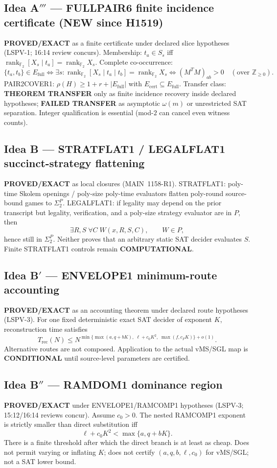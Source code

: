 \documentclass[11pt]{article}
\begin{document}
\subsection*{Idea A$'''$ --- FULLPAIR6 finite incidence certificate (NEW since H1519)}
\textbf{PROVED/EXACT} as a finite certificate under declared slice hypotheses
(LSPV-1; 16:14 review concurs). Membership:
$t_a\in S_s$ iff $\operatorname{rank}_{\mathbb F_2}[X_s\mid t_a]
=\operatorname{rank}_{\mathbb F_2}X_s$. Complete co-occurrence:
\[
\{t_a,t_b\}\in E_{\mathrm{full}}
\iff
\exists s:\operatorname{rank}_{\mathbb F_2}[X_s\mid t_a\mid t_b]
=\operatorname{rank}_{\mathbb F_2}X_s
\iff
(M^TM)_{ab}>0\quad(\text{over }\mathbb Z_{\ge 0}).
\]
PAIR2COVER1: $\rho(H)\ge 1+r+|E_{\mathrm{full}}|$ with
$E_{\mathrm{cert}}\subseteq E_{\mathrm{full}}$. Transfer class:
\textbf{THEOREM TRANSFER} only as finite incidence recovery inside declared
hypotheses; \textbf{FAILED TRANSFER} as asymptotic $\omega(m)$ or unrestricted SAT
separation. Integer qualification is essential (mod-$2$ can cancel even witness
counts).

\subsection*{Idea B --- STRATFLAT1 / LEGALFLAT1 succinct-strategy flattening}
\textbf{PROVED/EXACT} as local closures (MAIN~1158-R1).
STRATFLAT1: poly-time Skolem openings / poly-size poly-time evaluators flatten
poly-round source-bound games to $\Sigma_2^P$.
LEGALFLAT1: if legality may depend on the prior transcript but legality,
verification, and a poly-size strategy evaluator are in $P$, then
\[
\exists R,S\;\forall C\;W(x,R,S,C),\qquad W\in P,
\]
hence still in $\Sigma_2^P$. Neither proves that an arbitrary static SAT decider
evaluates $S$. Finite STRATFLAT1 controls remain \textbf{COMPUTATIONAL}.

\subsection*{Idea B$'$ --- ENVELOPE1 minimum-route accounting}
\textbf{PROVED/EXACT} as an accounting theorem under declared route hypotheses
(LSPV-3). For one fixed deterministic exact SAT decider of exponent $K$,
reconstruction time satisfies
\[
T_{\mathrm{rec}}(N)\le N^{\min\{\max(a,q+bK),\;\ell+c_0K^2,\;\max(f,c_FK)\}+o(1)}.
\]
Alternative routes are not composed. Application to the actual vMS/SGL map is
\textbf{CONDITIONAL} until source-level parameters are certified.

\subsection*{Idea B$''$ --- RAMDOM1 dominance region}
\textbf{PROVED/EXACT} under ENVELOPE1/RAMCOMP1 hypotheses (LSPV-3; 15:12/16:14
reviews concur). Assume $c_0>0$. The nested RAMCOMP1 exponent is strictly smaller
than direct substitution iff
\[
\ell+c_0K^2<\max\{a,q+bK\}.
\]
There is a finite threshold after which the direct branch is at least as cheap.
Does not permit varying or inflating $K$; does not certify $(a,q,b,\ell,c_0)$ for
vMS/SGL; not a SAT lower bound.
\end{document}
